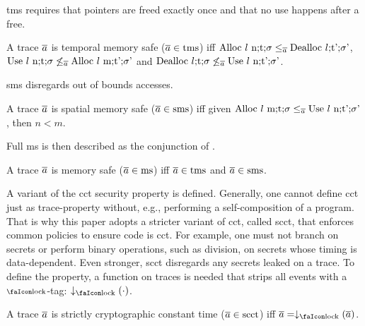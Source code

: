 \documentclass[utf8,acmsmall,review,screen,dvipsnames]{acmart}
\begin{document}
\gls{tms} requires that pointers are freed exactly once and that no use happens after a free.

\begin{definition}\label{def:trace:tmsdef}
  A trace $\overline{a}$ is temporal memory safe ($\overline{a}\in\operatorname{tms}$) iff $\ev{Alloc\ \loc\ n;\sandboxtag;\securitytag}\le_{\trace}\ev{Dealloc\ \loc;\sandboxtag';\securitytag'}$, $\ev{Use\ \loc\ n;\sandboxtag;\securitytag}\not\le_{\trace}\ev{Alloc\ \loc\ m;\sandboxtag';\securitytag'}$ and $\ev{Dealloc\ \loc;\sandboxtag;\securitytag}\not\le_{\trace}\ev{Use\ \loc\ n;\sandboxtag';\securitytag'}$.
\end{definition}

\gls{sms} disregards out of bounds accesses.

\begin{definition}\label{def:trace:smsdef}
  A trace $\overline{a}$ is spatial memory safe ($\overline{a}\in\operatorname{sms}$) iff given $\ev{Alloc\ \loc\ m;\sandboxtag;\securitytag}\le_{\trace}\ev{Use\ \loc\ n;\sandboxtag';\securitytag'}$, then $n<m$.
\end{definition}

Full \gls{ms} is then described as the conjunction of .

\begin{definition}[\glsfirst{ms}]\label{def:trace:msdef}
  A trace $\overline{a}$ is memory safe ($\overline{a}\in\operatorname{ms}$) iff $\overline{a}\in\operatorname{tms}$ and $\overline{a}\in\operatorname{sms}$.
\end{definition}

A variant of the \gls{cct} security property is defined.
Generally, one cannot define \gls{cct} just as trace-property without, e.g., performing a self-composition of a program.
That is why this paper adopts a stricter variant of \gls{cct}, called \gls{scct}, that enforces common policies to ensure code is \gls{cct}.
For example, one must not branch on secrets or perform binary operations, such as division, on secrets whose timing is data-dependent.
Even stronger, \gls{scct} disregards any secrets leaked on a trace.
To define the property, a function on traces is needed that strips all events with a $\lock$-tag: $\downarrow_{\lock}(\cdot)$.

\begin{definition}
  A trace $\overline{a}$ is strictly cryptographic constant time ($\overline{a}\in\operatorname{scct}$) iff $\trace=\downarrow_{\lock}\left(\trace\right)$.
\end{definition}
\end{document}
